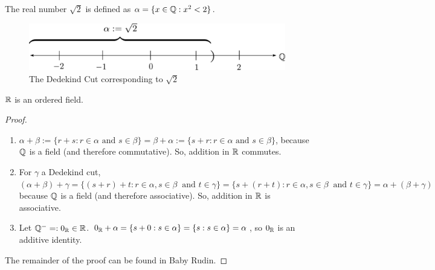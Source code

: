 \begin{eg}
		The real number $\sqrt{2}$ is defined as $\alpha = \{x\in \mathbb{Q} : x^2 < 2\}$.
        \begin{figure}[H]
    \centering
    \includegraphics[width=1\linewidth]{figures/sqrt2cut.pdf}
    \caption{The Dedekind Cut corresponding to $\sqrt{2}$}
    \label{fig:enter-label}
\end{figure}
\end{eg}

\begin{theorem}
	$\mathbb{R}$ is an ordered field.
\end{theorem}
\begin{proof}
	 \begin{enumerate}
	     \item $\alpha + \beta := \{r+s: r\in\alpha \text{ and } s\in\beta\}=\beta + \alpha := \{s+r: r\in\alpha \text{ and } s\in\beta\}$, because $\mathbb{Q}$ is a field (and therefore commutative). So, addition in $\mathbb{R}$ commutes.
        \item For $\gamma$ a Dedekind cut, $(\alpha + \beta)+\gamma = \{(s+r)+t: r\in\alpha, s\in\beta\ \text{ and } t\in\gamma\}=\{s+(r+t): r\in\alpha, s\in\beta\ \text{ and } t\in\gamma\} = \alpha + (\beta + 
    \gamma)$ because $\mathbb{Q}$ is a field (and therefore associative). So, addition in $\mathbb{R}$ is associative.
    \item Let $\mathbb{Q}^- =: 0_{\mathbb{R}} \in\mathbb{R}$. $0_{\mathbb{R}} + \alpha = \{s+0: s\in\alpha\}= \{s: s\in\alpha\} = \alpha$, so $0_{\mathbb{R}}$ is an additive identity.
	 \end{enumerate}  \hfill\break
   The remainder of the proof can be found in Baby Rudin.
\end{proof}
